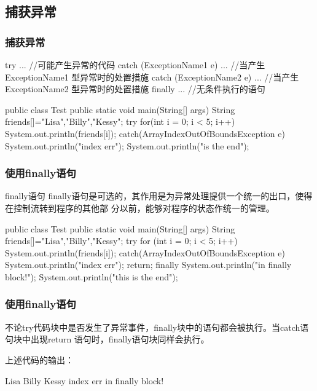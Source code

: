 \documentclass[compress,table]{beamer} %
\begin{document}
\subsection{捕获异常}
\begin{frame}[fragile] %
\frametitle{捕获异常}
\begin{javaCode}
try {
  ... //可能产生异常的代码
} catch (ExceptionName1 e) {
  ... //当产生 ExceptionName1 型异常时的处置措施
} catch (ExceptionName2 e) {
  ... //当产生 ExceptionName2 型异常时的处置措施
} finally {
  ... //无条件执行的语句
}
\end{javaCode}

\begin{javaCode}
public class Test {
  public static void main(String[] args) {
    String friends[]={"Lisa","Billy","Kessy"};
    try {
      for(int i = 0; i < 5; i++) {
        System.out.println(friends[i]);
      }
    } catch(ArrayIndexOutOfBoundsException e) {
      System.out.println("index err");
    }
    System.out.println("\nthis is the end");
  }
}
\end{javaCode}
\end{frame}

\begin{frame}[fragile] %
\frametitle{使用finally语句}
\begin{block}{finally语句}
finally语句是可选的，其作用是为异常处理提供一个统一的出口，使得在控制流转到程序的其他部
分以前，能够对程序的状态作统一的管理。
\end{block}
\begin{javaCode}
public class Test {
  public static void main(String[] args) {
    String friends[]={"Lisa","Billy","Kessy"};
    try {
      for (int i = 0; i < 5; i++) {
        System.out.println(friends[i]);
      }
    } catch(ArrayIndexOutOfBoundsException e) {
      System.out.println("index err");
      return;
    } finally {
      System.out.println("in finally block!");
    }
    System.out.println("this is the end");
  }
}
  
\end{javaCode}
\end{frame}

\begin{frame}[fragile] %
\frametitle{使用finally语句}

不论try代码块中是否发生了异常事件，finally块中的语句都会被执行。当catch语句块中出现return
语句时，finally语句块同样会执行。

上述代码的输出：
\begin{stdoutCode}
Lisa
Billy
Kessy
index err
in finally block!  
\end{stdoutCode}
\end{frame}
\end{document}
